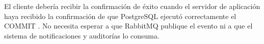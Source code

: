 \documentclass[12pt, a4paper]{article}
\begin{document}
El cliente debería recibir la confirmación de éxito cuando el servidor de aplicación haya recibido la confirmación de que PostgreSQL ejecutó correctamente el COMMIT \cite{auer2021}. No necesita esperar a que RabbitMQ publique el evento ni a que el sistema de notificaciones y auditorías lo consuma.

\vspace{0.4cm}

\nocite{*}
\printbibliography[title={Referencias asociadas al diagrama de comunicación}]
\end{document}
